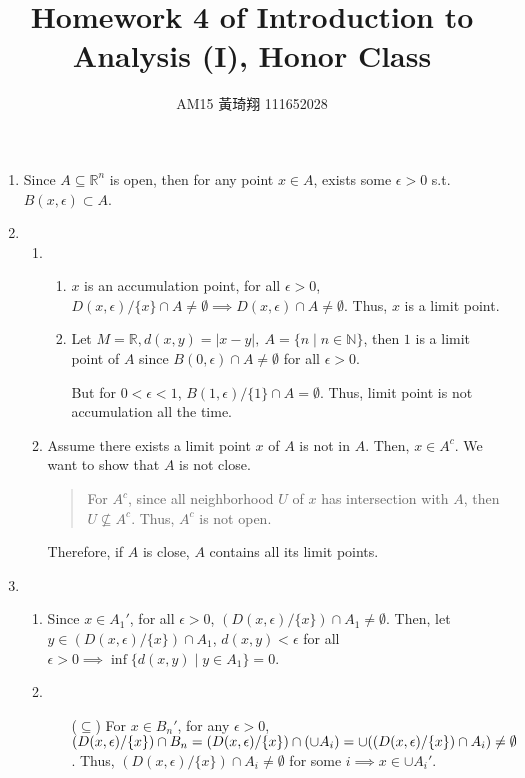 \documentclass[12pt]{article}
\title{Homework 4 of Introduction to Analysis (I), Honor Class}
\author{AM15 黃琦翔 111652028}
\begin{document}
\maketitle
\begin{enumerate}
    \item Since $A \subseteq \mathbb{R}^n$ is open,
    then for any point $x \in A$, exists some $\epsilon > 0$ s.t. $B(x, \epsilon) \subset A$.

    \item\begin{enumerate}
        \item\begin{enumerate}
            \item $x$ is an accumulation point, for all $\epsilon > 0$, $D(x, \epsilon)/\lbrace x \rbrace \cap A \neq \emptyset\implies D(x, \epsilon) \cap A \neq \emptyset$.
            Thus, $x$ is a limit point.
            \item Let $M = \mathbb{R}, d(x, y) = |x-y|,\ A = \lbrace n \mid n \in \mathbb{N}\rbrace$, then $1$ is a limit point of $A$ since $B(0, \epsilon) \cap A \neq \emptyset$ for all $\epsilon > 0$.
            
            But for $0 < \epsilon < 1$, $B(1, \epsilon)/\lbrace 1 \rbrace \cap A = \emptyset$. Thus, limit point is not accumulation all the time.
        \end{enumerate}
        \item Assume there exists a limit point $x$ of $A$ is not in $A$.
        Then, $x \in A^c$. We want to show that $A$ is not close.
        \begin{quote}
            For $A^c$, since all neighborhood $U$ of $x$ has intersection with $A$, then $U \nsubseteq A^c$. 
            Thus, $A^c$ is not open.
        \end{quote}

        Therefore, if $A$ is close, $A$ contains all its limit points.
    \end{enumerate}
    \newpage

    \item \begin{enumerate}
        \item Since $x \in A_1'$, for all $\epsilon > 0$, $(D(x, \epsilon)/\lbrace x \rbrace) \cap A_1 \neq \emptyset$.
        Then, let $y \in (D(x, \epsilon)/\lbrace x \rbrace) \cap A_1$, $d(x, y) < \epsilon$ for all $\epsilon > 0\implies \inf\lbrace d(x, y) \mid y \in A_1\rbrace = 0$.

        \item \begin{enumerate}
            \item[($\subseteq$)] For $x \in B_n'$, for any $\epsilon > 0$, $(D(x, \epsilon) / \lbrace x \rbrace) \cap B_n = (D(x, \epsilon) / \lbrace x \rbrace) \cap (\cup A_i) \\
            = \cup((D(x, \epsilon) / \lbrace x \rbrace) \cap A_i) \neq \emptyset$.
            Thus, $(D(x, \epsilon) / \lbrace x \rbrace) \cap A_i\neq \emptyset$ for some $i\implies x \in \cup A_i'$.
            

\end{enumerate}
\end{enumerate}
\end{enumerate}
\end{document}
